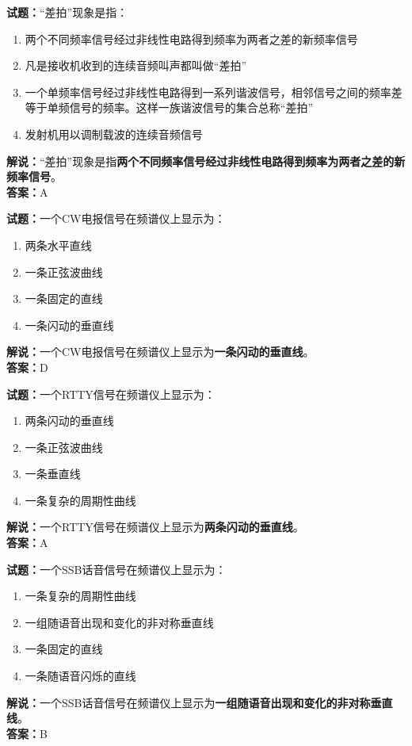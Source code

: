 \documentclass{ctexbook}
\begin{document}
\vspace{1em}

\textbf{试题：}“差拍”现象是指：
\begin{enumerate}[leftmargin=3em]
  \item 两个不同频率信号经过非线性电路得到频率为两者之差的新频率信号
  \item 凡是接收机收到的连续音频叫声都叫做“差拍”
  \item 一个单频率信号经过非线性电路得到一系列谐波信号，相邻信号之间的频率差等于单频信号的频率。这样一族谐波信号的集合总称“差拍”
  \item 发射机用以调制载波的连续音频信号
\end{enumerate}
\noindent\textbf{解说：}“差拍”现象是指\textbf{两个不同频率信号经过非线性电路得到频率为两者之差的新频率信号}。\\\noindent\textbf{答案：}A

\vspace{1em}

\textbf{试题：}一个CW电报信号在频谱仪上显示为：
\begin{enumerate}[leftmargin=3em]
  \item 两条水平直线
  \item 一条正弦波曲线
  \item 一条固定的直线
  \item 一条闪动的垂直线
\end{enumerate}
\noindent\textbf{解说：}一个CW电报信号在频谱仪上显示为\textbf{一条闪动的垂直线}。\\\noindent\textbf{答案：}D

\vspace{1em}

\textbf{试题：}一个RTTY信号在频谱仪上显示为：
\begin{enumerate}[leftmargin=3em]
  \item 两条闪动的垂直线
  \item 一条正弦波曲线
  \item 一条垂直线
  \item 一条复杂的周期性曲线
\end{enumerate}
\noindent\textbf{解说：}一个RTTY信号在频谱仪上显示为\textbf{两条闪动的垂直线}。\\\noindent\textbf{答案：}A

\vspace{1em}

\textbf{试题：}一个SSB话音信号在频谱仪上显示为：
\begin{enumerate}[leftmargin=3em]
  \item 一条复杂的周期性曲线
  \item 一组随语音出现和变化的非对称垂直线
  \item 一条固定的直线
  \item 一条随语音闪烁的直线
\end{enumerate}
\noindent\textbf{解说：}一个SSB话音信号在频谱仪上显示为\textbf{一组随语音出现和变化的非对称垂直线}。\\\noindent\textbf{答案：}B
\end{document}
